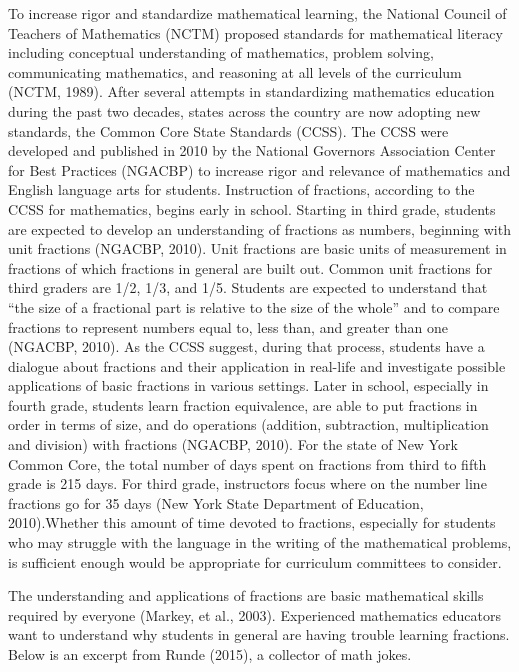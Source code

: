 \documentclass[11.5pt]{sig-alternate} %
\begin{document}
\begin{large}
To increase rigor and standardize mathematical learning, the National Council of Teachers of Mathematics (NCTM) proposed standards for mathematical literacy including conceptual understanding of mathematics, problem solving, communicating mathematics, and reasoning at all levels of the curriculum (NCTM, 1989). After several attempts in standardizing mathematics education during the past two decades, states across the country are now adopting new standards, the Common Core State Standards (CCSS). The CCSS were developed and published in 2010 by the National Governors Association Center for Best Practices (NGACBP) to increase rigor and relevance of mathematics and English language arts for students. Instruction of fractions, according to the CCSS for mathematics, begins early in school. Starting in third grade, students are expected to develop an understanding of fractions as numbers, beginning with unit fractions (NGACBP, 2010). Unit fractions are basic units of measurement in fractions of which fractions in general are built out. Common unit fractions for third graders are 1/2, 1/3, and 1/5. Students are expected to understand that “the size of a fractional part is relative to the size of the whole” and to compare fractions to represent numbers equal to, less than, and greater than one (NGACBP, 2010). As the CCSS suggest, during that process, students have a dialogue about fractions and their application in real-life and investigate possible applications of basic fractions in various settings.  Later in school, especially in fourth grade, students learn fraction equivalence, are able to put fractions in order in terms of size, and do operations (addition, subtraction, multiplication and division) with fractions (NGACBP, 2010).  For the state of New York Common Core, the total number of days spent on fractions from third to fifth grade is 215 days.  For third grade, instructors focus where on the number line fractions go for 35 days (New York State Department of Education, 2010).Whether this amount of time devoted to fractions, especially for students who may struggle with the language in the writing of the mathematical problems, is sufficient enough would be appropriate for curriculum committees to consider.

The understanding and applications of fractions are basic mathematical skills required by everyone (Markey, et al., 2003). Experienced mathematics educators want to understand why students in general are having trouble learning fractions. Below is an excerpt from Runde (2015), a collector of math jokes.			



\end{large}
\end{document}
